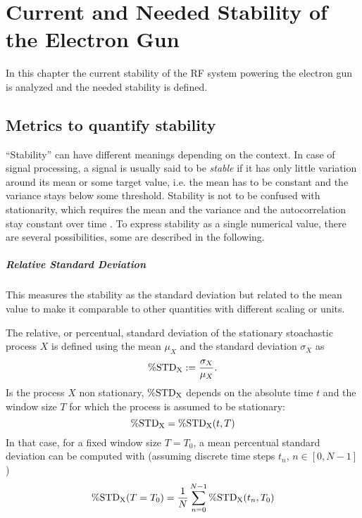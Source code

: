 \chapter{Current and Needed Stability of the Electron Gun}
In this chapter the current stability of the RF system powering the electron gun is analyzed and the needed stability is defined.

\section{Metrics to quantify stability}\label{sec:metrics}
``Stability'' can have different meanings depending on the context. In case of signal processing, a signal is usually said to be \textit{stable} if it has only little variation around its mean or some target value, i.e. the mean has to be constant and the variance stays below some threshold. 
Stability is not to be confused with stationarity, which requires the mean and the variance and the autocorrelation stay constant over time \cite{Guthrie2020}. To express stability as a single numerical value, there are several possibilities, some are described in the following.

\paragraph{Relative Standard Deviation}
This measures the stability as the standard deviation but related to the mean value to make it comparable to other quantities with different scaling or units.

The relative, or percentual, standard deviation of the stationary stoachastic process $X$ is defined using the mean $\mu_X$ and the standard deviation $\sigma_X$ as
\begin{equation}
\operatorname{\%STD_X} := \frac{\sigma_X}{\mu_X}.
\end{equation}
Is the process $X$ non stationary, $\operatorname{\%STD_X}$ depends on the absolute time $t$ and the window size $T$ for which the process is assumed to be stationary:
\begin{equation}
\operatorname{\%STD_X} = \operatorname{\%STD_X}(t,T)
\end{equation}
In that case, for a fixed window size $T=T_0$, a mean percentual standard deviation can be computed with (assuming discrete time steps $t_n$, $n\in[0,N-1]$)
\begin{equation}
\operatorname{\%STD_X}(T=T_0) = \frac{1}{N} \sum_{n=0}^{N-1} \operatorname{\%STD_X}(t_n,T_0)
\end{equation}


